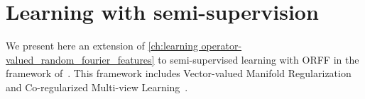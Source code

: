 


\section{Learning with semi-supervision}
We present here an extension of \cref{ch:learning
operator-valued_random_fourier_features} to semi-supervised learning with
\acs{ORFF} in the framework of~\citet{minh2016unifying}. This framework
includes Vector-valued Manifold
Regularization~\citep{belkin2006manifold,Brouard2011,minh2013unifying} and
Co-regularized Multi-view
Learning~\citep{brefeld2006efficient,sindhwani2008rkhs,rosenberg2009kernel,
sun2011multi}.

